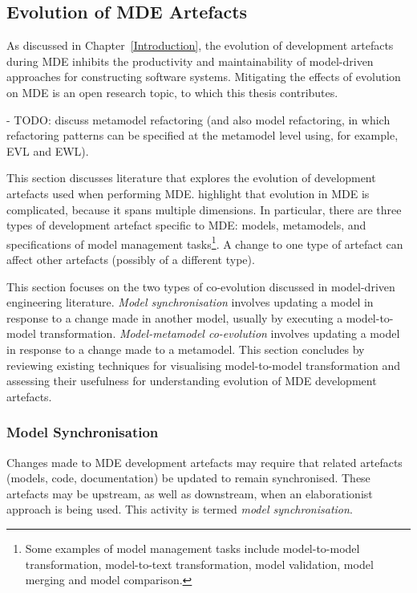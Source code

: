 \subsection{Evolution of MDE Artefacts}
\label{LitReview:SoftwareEvo:MdeEvo}
As discussed in Chapter~\ref{Introduction}, the evolution of development artefacts during MDE inhibits the productivity and maintainability of model-driven approaches for constructing software systems. Mitigating the effects of evolution on MDE is an open research topic, to which this thesis contributes.

- TODO: discuss metamodel refactoring (and also model refactoring, in which refactoring patterns can be specified at the metamodel level using, for example, EVL and EWL).

This section discusses literature that explores the evolution of development artefacts used when performing MDE. \cite{deursen07mdse} highlight that evolution in MDE is complicated, because it spans multiple dimensions. In particular, there are three types of development artefact specific to MDE: models, metamodels, and specifications of model management tasks\footnote{Some examples of model management tasks include model-to-model transformation, model-to-text transformation, model validation, model merging and model comparison.}. A change to one type of artefact can affect other artefacts (possibly of a different type). 

This section focuses on the two types of co-evolution discussed in model-driven engineering literature. \emph{Model synchronisation} involves updating a model in response to a change made in another model, usually by executing a model-to-model transformation. \emph{Model-metamodel co-evolution} involves updating a model in response to a change made to a metamodel. This section concludes by reviewing existing techniques for visualising model-to-model transformation and assessing their usefulness for understanding evolution of MDE development artefacts. 

\subsubsection{Model Synchronisation}
\label{LitReview:ArtefactCoEvo}
Changes made to MDE development artefacts may require that related artefacts (models, code, documentation) be updated to remain synchronised. These artefacts may be upstream, as well as downstream, when an elaborationist approach is being used. This activity is termed \textit{model synchronisation}.

